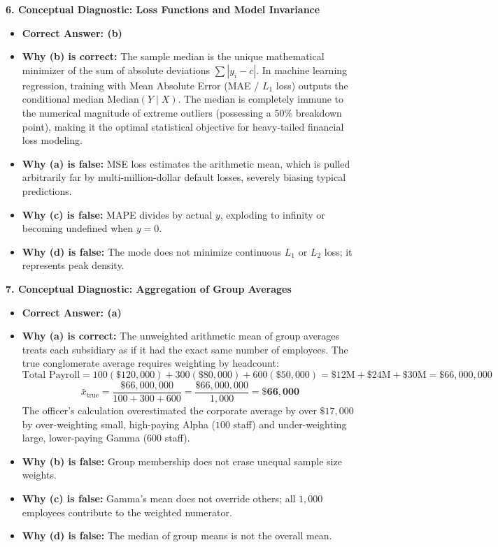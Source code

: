 \textbf{6. Conceptual Diagnostic: Loss Functions and Model Invariance}
\begin{itemize}
    \item \textbf{Correct Answer: (b)}
    \item \textbf{Why (b) is correct:} The sample median is the unique mathematical minimizer of the sum of absolute deviations $\sum |y_i - c|$. In machine learning regression, training with Mean Absolute Error (MAE / $L_1$ loss) outputs the conditional median $\text{Median}(Y \mid X)$. The median is completely immune to the numerical magnitude of extreme outliers (possessing a $50\%$ breakdown point), making it the optimal statistical objective for heavy-tailed financial loss modeling.
    \item \textbf{Why (a) is false:} MSE loss estimates the arithmetic mean, which is pulled arbitrarily far by multi-million-dollar default losses, severely biasing typical predictions.
    \item \textbf{Why (c) is false:} MAPE divides by actual $y$, exploding to infinity or becoming undefined when $y = 0$.
    \item \textbf{Why (d) is false:} The mode does not minimize continuous $L_1$ or $L_2$ loss; it represents peak density.
\end{itemize}

\textbf{7. Conceptual Diagnostic: Aggregation of Group Averages}
\begin{itemize}
    \item \textbf{Correct Answer: (a)}
    \item \textbf{Why (a) is correct:} The unweighted arithmetic mean of group averages treats each subsidiary as if it had the exact same number of employees. The true conglomerate average requires weighting by headcount:
    $$\text{Total Payroll} = 100(\$120{,}000) + 300(\$80{,}000) + 600(\$50{,}000) = \$12\text{M} + \$24\text{M} + \$30\text{M} = \$66{,}000{,}000$$
    $$\bar{x}_{\text{true}} = \frac{\$66{,}000{,}000}{100 + 300 + 600} = \frac{\$66{,}000{,}000}{1{,}000} = \mathbf{\$66{,}000}$$
    The officer's calculation overestimated the corporate average by over $\$17{,}000$ by over-weighting small, high-paying Alpha ($100$ staff) and under-weighting large, lower-paying Gamma ($600$ staff).
    \item \textbf{Why (b) is false:} Group membership does not erase unequal sample size weights.
    \item \textbf{Why (c) is false:} Gamma's mean does not override others; all $1{,}000$ employees contribute to the weighted numerator.
    \item \textbf{Why (d) is false:} The median of group means is not the overall mean.
\end{itemize}


